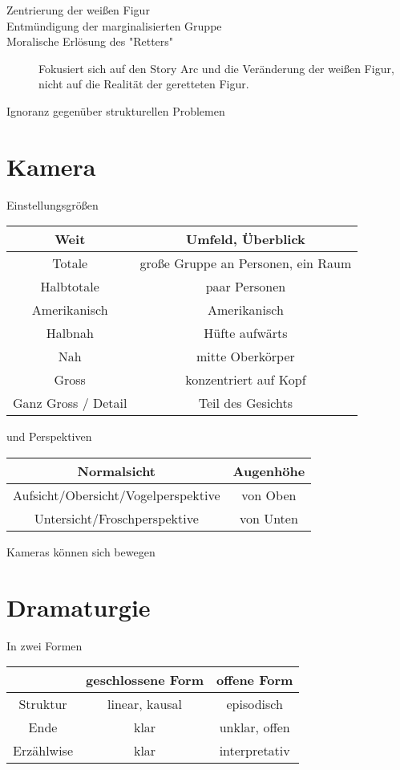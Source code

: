 \documentclass{article}
\begin{document}
\begin{description}
\item[Zentrierung der weißen Figur]
\item[Entmündigung der marginalisierten Gruppe]  
\item[Moralische Erlösung des "Retters"]
Fokusiert sich auf den Story Arc und die Veränderung der weißen Figur, nicht auf die Realität der geretteten Figur.  
\item[Ignoranz gegenüber strukturellen Problemen]
\end{description}
 
\newpage
 
\section{Kamera} 
Einstellungsgrößen
\begin{center}
\begin{tabular}{ |c|c| } 
\hline
 Weit & Umfeld, Überblick \\
\hline
 Totale & große Gruppe an Personen, ein Raum \\
\hline
 Halbtotale & paar Personen \\
\hline
 Amerikanisch & Amerikanisch \\
\hline
 Halbnah & Hüfte aufwärts \\
\hline
 Nah & mitte Oberkörper \\
\hline
 Gross & konzentriert auf Kopf \\
\hline
 Ganz Gross / Detail & Teil des Gesichts \\
\hline
\end{tabular}
\end{center} 
und Perspektiven
 
\begin{center}
\begin{tabular}{ |c|c| }
\hline
 Normalsicht & Augenhöhe \\
\hline
 Aufsicht/Obersicht/Vogelperspektive & von Oben \\
\hline
 Untersicht/Froschperspektive & von Unten \\
\hline
\end{tabular}
\end{center}
Kameras können sich bewegen
 
\section{Dramaturgie}
In zwei Formen 
\begin{center}
\begin{tabular}{ |c|c|c| }
\hline
 & \textbf{geschlossene Form} & \textbf{offene Form} \\
\hline
 Struktur & linear, kausal & episodisch \\
\hline 
 Ende & klar & unklar, offen \\
\hline 
 Erzählwise & klar & interpretativ \\
\hline 
\end{tabular}
\end{center} 
  
\end{document}
